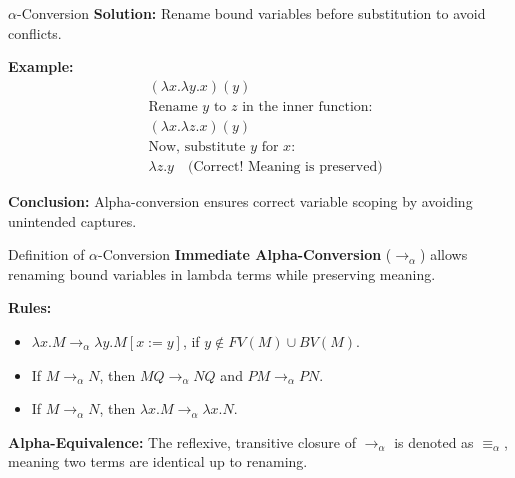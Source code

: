 \documentclass{beamer}
\begin{document}
\begin{frame}{$\alpha$-Conversion}
  \textbf{Solution:} Rename bound variables before substitution to avoid conflicts.
  
  \vspace{0.5cm}
  \textbf{Example:}
  \begin{align*}
      & (\lambda x. \lambda y. x) (y) \\
      & \text{Rename } y \text{ to } z \text{ in the inner function:}\\
      & (\lambda x. \lambda z. x) (y) \\
      & \text{Now, substitute } y \text{ for } x:\\
      & \lambda z. y \quad \text{(Correct! Meaning is preserved)}
  \end{align*}

  \vspace{0.5cm}
  \textbf{Conclusion:} Alpha-conversion ensures correct variable scoping by avoiding unintended captures.
\end{frame}

\begin{frame}{Definition of $\alpha$-Conversion}
  \textbf{Immediate Alpha-Conversion} ($\rightarrow_{\alpha}$) allows renaming bound variables in lambda terms while preserving meaning.
  
  \vspace{0.5cm}
  \textbf{Rules:}
  \begin{itemize}
      \item $\lambda x. M \rightarrow_{\alpha} \lambda y. M[x := y]$, if $y \notin FV(M) \cup BV(M)$.
      \item If $M \rightarrow_{\alpha} N$, then $MQ \rightarrow_{\alpha} NQ$ and $PM \rightarrow_{\alpha} PN$.
      \item If $M \rightarrow_{\alpha} N$, then $\lambda x. M \rightarrow_{\alpha} \lambda x. N$.
  \end{itemize}
  
  \vspace{0.5cm}
  \textbf{Alpha-Equivalence:} The reflexive, transitive closure of $\rightarrow_{\alpha}$ is denoted as $\equiv_{\alpha}$, meaning two terms are identical up to renaming.
\end{frame}
\end{document}
